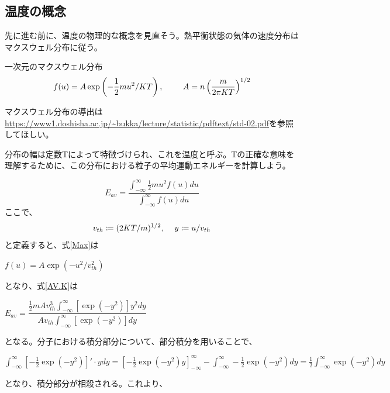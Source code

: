 \documentclass{ltjsarticle}
\numberwithin{equation}{section} %
\begin{document}
\subsection{温度の概念}
先に進む前に、温度の物理的な概念を見直そう。熱平衡状態の気体の速度分布はマクスウェル分布に従う。

\begin{eqbox}{一次元のマクスウェル分布}
\begin{equation}
f(u) = A \exp\left(-\frac{1}{2}mu^2/KT\right),\hspace{2pc} A = n\left(\frac{m}{2\pi KT}\right)^{1/2} \label{Max}
\end{equation}
\end{eqbox}

マクスウェル分布の導出は\url{https://www1.doshisha.ac.jp/~bukka/lecture/statistic/pdftext/std-02.pdf}を参照してほしい。

分布の幅は定数Tによって特徴づけられ、これを温度と呼ぶ。Tの正確な意味を理解するために、この分布における粒子の平均運動エネルギーを計算しよう。

\begin{equation}
 E_{av} = \frac{\int_{-\infty}^{\infty} \frac{1}{2}mu^2 f(u)du}{\int_{-\infty}^{\infty} f(u)du} \label{AV.K}
\end{equation}
ここで、
\begin{equation}
  v_{th} \coloneqq (2KT/m)^{1/2}, \hspace{1pc} y \coloneqq u/v_{th} \label{df.v_th}
\end{equation}
と定義すると、式\eqref{Max}は

\begin{center}
 $f(u) = A \exp(-u^2/v^2_{th})$ 
\end{center}
となり、式\eqref{AV.K}は

\begin{center}
  $E_{av} = \dfrac{\frac{1}{2}mAv^3_{th}\int_{-\infty}^{\infty}[\exp(-y^2)]y^2dy}{Av_{th}\int_{-\infty}^{\infty}[\exp(-y^2)]dy}$
\end{center}
となる。分子における積分部分について、部分積分を用いることで、

\begin{center}
  $\int_{-\infty}^{\infty} [-\frac{1}{2}\exp(-y^2)]'\cdot ydy = \left[-\frac{1}{2}\exp(-y^2)y\right]_{-\infty}^{\infty} - \int_{-\infty}^{\infty} -\frac{1}{2}\exp(-y^2)dy
  = \frac{1}{2}\int_{-\infty}^{\infty}\exp(-y^2)dy $
\end{center}
となり、積分部分が相殺される。これより、
\end{document}
